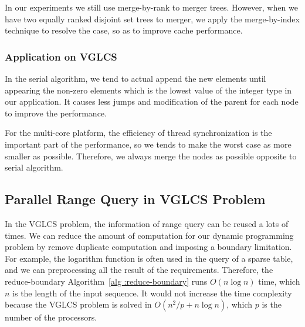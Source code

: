 In our experiments we still use merge-by-rank to merger trees.
However, when we have two equally ranked disjoint set trees to merger,
we apply the merge-by-index technique to resolve the case, so as to
improve cache performance.

\subsubsection{Application on VGLCS}


In the serial algorithm, we tend to actual append the new elements until
appearing the non-zero elements which is the lowest value of the integer
type in our application.  It causes less jumps and modification of the
parent for each node to improve the performance.

For the multi-core platform, the efficiency of thread synchronization is
the important part of the performance, so we tends to make the worst
case as more smaller as possible.  Therefore, we always merge the nodes
as possible opposite to serial algorithm.



\iffalse
在單一處理器下，由於動態規劃常會遇到不合定義而填入連續的 0，
多次的插入操作可以直到下一個非零的時候再進行，同時也改善查表的花費，
直到下一個非零的才進行的操作，增加嚴重增加某一次操作的時間。

在多核心平台下，要避免單一操作時間過長，一旦單一操作時間過長，
多個工作的同步將變得非常沒有效率。因此，每一次操作都強制合併，這有別於循序算法的版本。
\fi

\subsection{Parallel Range Query in VGLCS Problem}


In the VGLCS problem, the information of range query can be reused a
lots of times.  We can reduce the amount of computation for our dynamic
programming problem by remove duplicate computation and imposing a
boundary limitation.  For example, the logarithm function is often used
in the query of a sparse table, and we can preprocessing all the result
of the requirements.  Therefore, the reduce-boundary Algorithm~\ref{alg
:reduce-boundary} runs $O(n \log n)$ time, which $n$  is the length of
the input sequence.  It would not increase the time complexity because
the VGLCS problem is solved in  $O(n^2 / p + n \log n)$, which $p$ is
the number of the processors.


